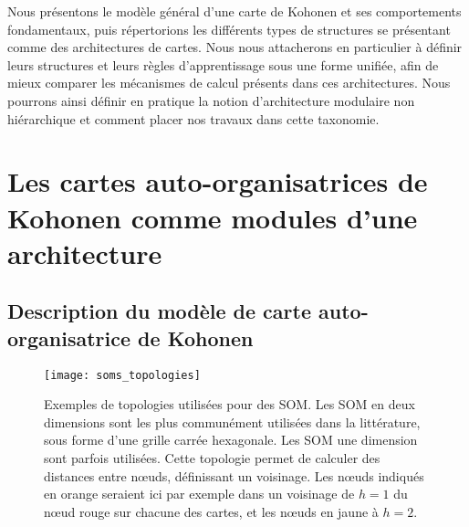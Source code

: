 \documentclass[../main]{subfiles}
\begin{document}
Nous présentons le modèle général d'une carte de Kohonen et ses comportements fondamentaux, puis répertorions les différents types de structures se présentant comme des architectures de cartes. 
Nous nous attacherons en particulier à définir leurs structures et leurs règles d'apprentissage sous une forme unifiée, afin de mieux comparer les mécanismes de calcul présents dans ces architectures.
Nous pourrons ainsi définir en pratique la notion d'architecture modulaire non hiérarchique et comment placer nos travaux dans cette taxonomie.

\section{Les cartes auto-organisatrices de Kohonen comme modules d'une architecture}\label{sec:som001}

\subsection{Description du modèle de carte auto-organisatrice de Kohonen}\label{sec:modele_som}

\begin{figure}
    \centering
    \texttt{[image: soms\_topologies]}
    \caption{Exemples de topologies utilisées pour des SOM. 
    Les SOM en deux dimensions sont les plus communément utilisées dans la littérature, sous forme d'une grille carrée hexagonale. Les SOM une dimension sont parfois utilisées. Cette topologie permet de calculer des distances entre n\oe{}uds, définissant un voisinage. Les n\oe{}uds indiqués en orange seraient ici par exemple dans un voisinage de $h = 1$ du n\oe{}ud rouge sur chacune des cartes, et les n\oe{}uds en jaune à $h = 2$.
    \label{fig:topo}}
    \end{figure}
\end{document}
